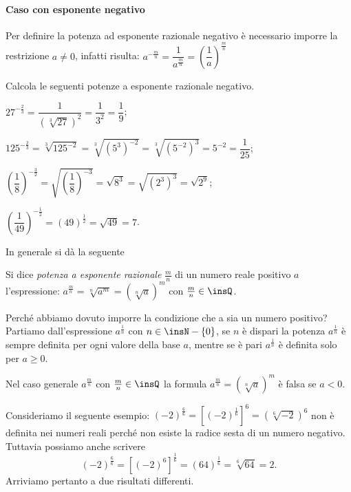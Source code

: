 \paragraph{Caso con esponente negativo}
Per definire la potenza ad esponente razionale negativo è necessario imporre la restrizione $a{\neq}0$, infatti risulta:
$a^{-\frac m n}=\dfrac 1{a^{\frac m n}}=\left(\dfrac 1 a\right)^{\frac m n}$

\begin{exrig}
\begin{esempio}
 Calcola le seguenti potenze a esponente razionale negativo.
 \begin{itemize*}
 \item $27^{-\frac 2 3}=\dfrac 1{\left(\sqrt[3]{27}\right)^2}=\dfrac 1{3^2}=\dfrac 1 9$;
 \item $125^{-\frac 2 3}=\sqrt[3]{125^{-2}}=\sqrt[3]{(5^3)^{-2}}=\sqrt[3]{(5^{-2})^3}=5^{-2}=\dfrac 1{25}$;
 \item $\left(\dfrac 1 8\right)^{-\frac 3 2}=\sqrt{\left(\dfrac 1 8\right)^{-3}}=\sqrt{8^3}=\sqrt{(2^3)^3}=\sqrt{2^9}$;
 \item $\left(\dfrac 1{49}\right)^{-\frac 1 2}=(49)^{\frac 1 2}=\sqrt{49}=7$.
\end{itemize*}
\end{esempio}
\end{exrig}

In generale si dà la seguente
\begin{definizione}
Si dice \emph{potenza a esponente razionale} $\frac m n$ di un numero reale positivo $a$ l’espressione:
 $a^{\frac m n}=\sqrt[n]{a^m}=\left(\sqrt[n]a\right)^m$ con $\frac m n\in \insQ$.
\end{definizione}

Perché abbiamo dovuto imporre la condizione che a sia un numero positivo?
Partiamo dall’espressione $a^{\frac 1 n}$ con $n\in \insN-\{0\}$, se $n$ è dispari la potenza $a^{\frac 1 n}$ è sempre definita per ogni valore della base $a$, mentre se è pari $a^{\frac 1 n}$ è definita solo per $a{\geq}0$.

Nel caso generale $a^{\frac m n}$ con $\frac m n\in \insQ$ la formula $a^{\frac m n}=\left(\sqrt[n]a\right)^m$ è falsa se $a<0$.

Consideriamo il seguente esempio:
 $(-2)^{\frac 6 6}=\left[(-2)^{\frac 1 6}\right]^6=\left(\sqrt[6]{-2}\right)^6$ non è definita nei numeri reali perché non esiste la radice sesta di un numero negativo.
Tuttavia possiamo anche scrivere 
\[(-2)^{\frac 6 6}=\left[(-2)^6\right]^{\frac 1 6}=(64)^{\frac 1 6}=\sqrt[6]{64}=2.\]
Arriviamo pertanto a due risultati differenti.

